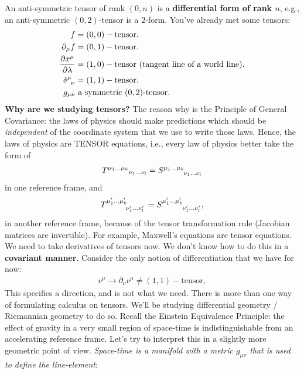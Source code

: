 \documentclass[11pt]{article}
\newcommand{\kltensor}[0]{\tensor{T}{^{\mu_1 ... \mu_k}}_{\nu_1 ... \nu_l}}
\theoremstyle{definition}
\begin{document}
An anti-symmetric tensor of rank \( (0,n) \) is a \textbf{differential form of rank \( n \)}, e.g., an anti-symmetric \( (0,2) \)-tensor is a \(2\)-form. You've already met some tensors: 
\begin{align*}
	f & = (0,0)-\text{tensor.}  \\
	\partial_\mu f& = (0,1)-\text{tensor.} \\
	\frac{\partial x^\mu}{\partial \lambda} & = (1,0)-\text{tensor}  \text{ (tangent line of a world line).} \\
	\tensor{\delta}{^\mu_\nu} & = (1,1)-\text{tensor.} \\
	g_{\mu \nu} & \text{ a symmetric \((0,2)\)-tensor.} 
\end{align*}
\textbf{Why are we studying tensors?} The reason why is the Principle of General Covariance: the laws of physics should make predictions which should be \emph{independent} of the coordinate system that we use to write those laws. Hence, the laws of physics are TENSOR equations, i.e., every law of physics better take the form of 
\begin{align*}
	\kltensor = \tensor{S}{^{\mu_1 ... \mu_k}_{\nu_1 ... \nu_l}}
\end{align*}
in one reference frame, and 
\begin{align*}
	\tensor{T}{^{\mu_1' ... \mu_k'}_{\nu_1' ... \nu_l'}} = \tensor{S}{^{\mu_1' ... \mu_k'}_{\nu_1' ... \nu_l'}}, 
\end{align*}
in another reference frame, because of the tensor transformation rule (Jacobian matrices are invertible). For example, Maxwell's equations are tensor equations. 
\newline
\newline
We need to take derivatives of tensors now. We don't know how to do this in a \textbf{covariant manner}. Consider the only notion of differentiation that we have for now: 
\begin{align*}
	v^\mu \rightarrow \partial_\nu v^\mu \neq (1,1)-\text{tensor}, 
\end{align*}
This specifies a direction, and is not what we need. There is more than one way of formulating calculus on tensors. We'll be studying differential geometry / Riemannian geometry to do so. 
\newline
\newline
Recall the Einstein Equivalence Principle: the effect of gravity in a very small region of space-time is indistinguishable from an accelerating reference frame. Let's try to interpret this in a slightly more geometric point of view. \emph{Space-time is a manifold with a metric \( g_{\mu \nu}\) that is used to define the line-element}:
\end{document}

